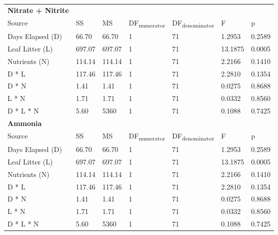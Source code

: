 \begin{table}
\label{tab:nut_anova}
\begin{tabular}{ l l l l l l l }
\textbf{Nitrate + Nitrite} & & & & & &\\
Source           & SS      & MS     & DF\textsubscript{numerator} & DF\textsubscript{denominator} & F       & p  \\
Days Elapsed (D) & 66.70   & 66.70  & 1                           & 71                            & 1.2953  & 0.2589 \\
Leaf Litter (L)  & 697.07  & 697.07 & 1                           & 71                            & 13.1875 & 0.0005 \\
Nutrients (N)    & 114.14  & 114.14 & 1                           & 71                            & 2.2166  & 0.1410 \\
D * L            & 117.46  & 117.46 & 1                           & 71                            & 2.2810  & 0.1354 \\
D * N            & 1.41    & 1.41   & 1                           & 71                            & 0.0275  & 0.8688 \\
L * N            & 1.71    & 1.71   & 1                           & 71                            & 0.0332  & 0.8560 \\
D * L * N        & 5.60    & 5360   & 1                           & 71                            & 0.1088  & 0.7425 \\

\textbf{Ammonia} & & & & & &\\
Source           & SS      & MS     & DF\textsubscript{numerator} & DF\textsubscript{denominator} & F       & p  \\
Days Elapsed (D) & 66.70   & 66.70  & 1                           & 71                            & 1.2953  & 0.2589 \\
Leaf Litter (L)  & 697.07  & 697.07 & 1                           & 71                            & 13.1875 & 0.0005 \\
Nutrients (N)    & 114.14  & 114.14 & 1                           & 71                            & 2.2166  & 0.1410 \\
D * L            & 117.46  & 117.46 & 1                           & 71                            & 2.2810  & 0.1354 \\
D * N            & 1.41    & 1.41   & 1                           & 71                            & 0.0275  & 0.8688 \\
L * N            & 1.71    & 1.71   & 1                           & 71                            & 0.0332  & 0.8560 \\
D * L * N        & 5.60    & 5360   & 1                           & 71                            & 0.1088  & 0.7425 \\


\end{tabular}
\end{table}
